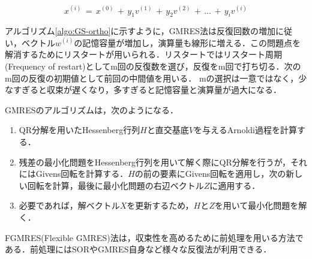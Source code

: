 \begin{equation}
x^{(i)} \,=\, x^{(0)} \,+\, y_1 v^{(1)} \,+\, y_2 v^{(2)} \,+\, \dots \,+\, y_i v^{(i)}
\label{eq:GMRES iteration}
\end{equation}


アルゴリズム\ref{algo:GS-ortho}に示すように，GMRES法は反復回数の増加に従い，ベクトル$w^{(i)}$の記憶容量が増加し，演算量も線形に増える．この問題点を解消するためにリスタートが用いられる．リスタートではリスタート周期(Frequency of restart)としてm回の反復数を選び，反復をm回で打ち切る．次のm回の反復の初期値として前回の中間値を用いる．
mの選択は一意ではなく，少なすぎると収束が遅くなり，多すぎると記憶容量と演算量が過大になる．

\vspace{3mm}
GMRESのアルゴリズムは，次のようになる．
\begin{enumerate}
\item QR分解を用いたHessenberg行列$H$と直交基底$V$を与えるArnoldi過程を計算する．
\item 残差の最小化問題をHessenberg行列を用いて解く際にQR分解を行うが，それにはGivens回転を計算する．$H$の前の要素にGivens回転を適用し，次の新しい回転を計算，最後に最小化問題の右辺ベクトル$Z$に適用する．
\item 必要であれば，解ベクトル$X$を更新するため，$H$と$Z$を用いて最小化問題を解く．
\end{enumerate}



FGMRES(Flexible GMRES)法は，収束性を高めるために前処理を用いる方法である．前処理にはSORやGMRES自身など様々な反復法が利用できる．



